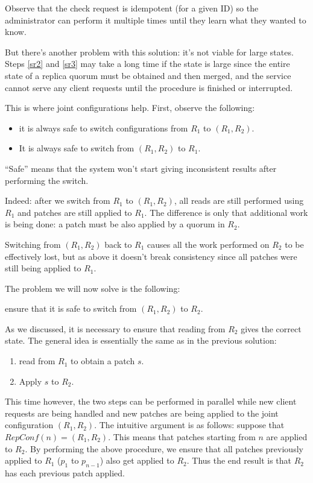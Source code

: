 \documentclass[12pt,a4paper,en]{pracamgr}
\begin{document}
Observe that the check request is idempotent (for a given ID) so the administrator can perform it multiple times until they learn what they wanted to know.

But there's another problem with this solution: it's not viable for large states. Steps \ref{sr2} and \ref{sr3} may take a long time if the state is large since the entire state of a replica quorum must be obtained and then merged, and the service cannot serve any client requests until the procedure is finished or interrupted.

This is where joint configurations help. First, observe the following:
\begin{itemize}
    \item it is always safe to switch configurations from $R_1$ to $(R_1, R_2)$.
    \item It is always safe to switch from $(R_1, R_2)$ to $R_1$.
\end{itemize}
``Safe'' means that the system won't start giving inconsistent results after performing the switch.

Indeed: after we switch from $R_1$ to $(R_1, R_2)$, all reads are still performed using $R_1$ and patches are still applied to $R_1$. The difference is only that additional work is being done: a patch must be also applied by a quorum in $R_2$.

Switching from $(R_1, R_2)$ back to $R_1$ causes all the work performed on $R_2$ to be effectively lost, but as above it doesn't break consistency since all patches were still being applied to $R_1$.

The problem we will now solve is the following:
\begin{center} ensure that it is safe to switch from $(R_1, R_2)$ to $R_2$. \end{center}
As we discussed, it is necessary to ensure that reading from $R_2$ gives the correct state. The general idea is essentially the same as in the previous solution:
\begin{enumerate}
    \item read from $R_1$ to obtain a patch $s$.
    \item Apply $s$ to $R_2$.
\end{enumerate}
This time however, the two steps can be performed in parallel while new client requests are being handled and new patches are being applied to the joint configuration $(R_1, R_2)$. The intuitive argument is as follows: suppose that $RepConf(n) = (R_1, R_2)$. This means that patches starting from $n$ are applied to $R_2$. By performing the above procedure, we ensure that all patches previously applied to $R_1$ ($p_1$ to $p_{n-1}$) also get applied to $R_2$. Thus the end result is that $R_2$ has each previous patch applied.
\end{document}
